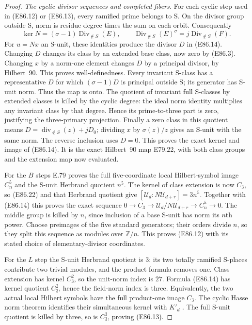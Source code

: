 \begin{proof}
\emph{The cyclic divisor sequences and completed fibers.}
For each cyclic step used in (E86.12) or
(E86.13), every ramified prime belongs
to S. On the divisor group outside S,
norm is residue degree times the sum
on each orbit. Consequently
\[
 \ker N=(\sigma-1)\operatorname{Div}_{\notin S}(E),
 \qquad
 \operatorname{Div}_{\notin S}(E)^{\sigma}
                 =j\operatorname{Div}_{\notin S}(F).
 \tag{E86.28}
\]
For $u=Nx$ an S-unit, these identities
produce the divisor $D$ in (E86.14).
Changing $D$ changes its class by an
extended base class, now zero by
(E86.3). Changing $x$ by a norm-one
element changes $D$ by a principal
divisor, by Hilbert~90. This proves
well-definedness. Every invariant
S-class has a representative $D$ for
which $(\sigma-1)D$ is principal
outside S; its generator has S-unit
norm. Thus the map is onto. The quotient of
invariant full S-classes by extended classes
is killed by the cyclic degree: the ideal
norm identity multiplies any invariant class
by that degree. Hence its prime-to-three part
is zero, justifying the three-primary projection.
Finally a zero class in this quotient means
$D=\operatorname{div}_{\notin S}(z)+jD_0$;
dividing $x$ by $\sigma(z)/z$ gives an
S-unit with the same norm. The reverse
inclusion uses $D=0$. This proves the
exact kernel and image of (E86.14).
It is the exact Hilbert~90 map E79.22,
with both class groups and the extension
map now evaluated.

For the $B$ steps E.79 proves the full
five-coordinate local Hilbert-symbol
image $C_n^5$ and the S-unit Herbrand
quotient $n^5$. The kernel of class
extension is now $C_3$, so (E86.22)
and that Herbrand quotient give
$[\mathscr U_d:N\mathscr U_{d+r}]=3n^5$.
Together with (E86.14) this proves
the exact sequence
$0\to C_3\to\mathscr U_d/N\mathscr U_{d+r}
\to C_n^5\to0$.
The middle group is killed by $n$,
since inclusion of a base S-unit has
norm its $n$th power. Choose preimages
of the five standard generators; their
orders divide $n$, so they split this
sequence as modules over $\mathbb Z/n$.
This proves (E86.12) with its stated
choice of elementary-divisor coordinates.

For the $L$ step the S-unit Herbrand
quotient is $3$: its two totally
ramified S-places contribute two
trivial modules, and the product
formula removes one. Class extension
has kernel $C_3^2$, so the unit-norm
index is $27$. Formula (E86.14) has
kernel quotient $C_3^2$, hence the
field-norm index is three. Equivalently,
the two actual local Hilbert symbols
have the full product-one image $C_3$.
The cyclic Hasse norm theorem identifies
their simultaneous kernel with $K'_d$
\cite[VIII, Theorem~3.1]{E_MilneCFT}.
The full S-unit quotient is killed by
three, so is $C_3^3$, proving (E86.13).


\end{proof}

